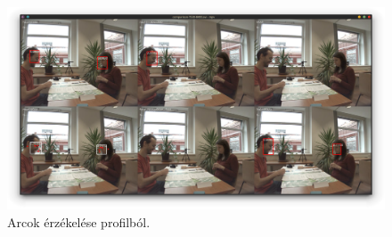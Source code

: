 \begin{figure}
    \centering
    \includegraphics[width=\linewidth]{figures/video_comparison/insightface_superiority/video_comparison_profile.png}
    \caption{Arcok érzékelése profilból.}
    \label{fig:video_comparison_profile}
\end{figure}

